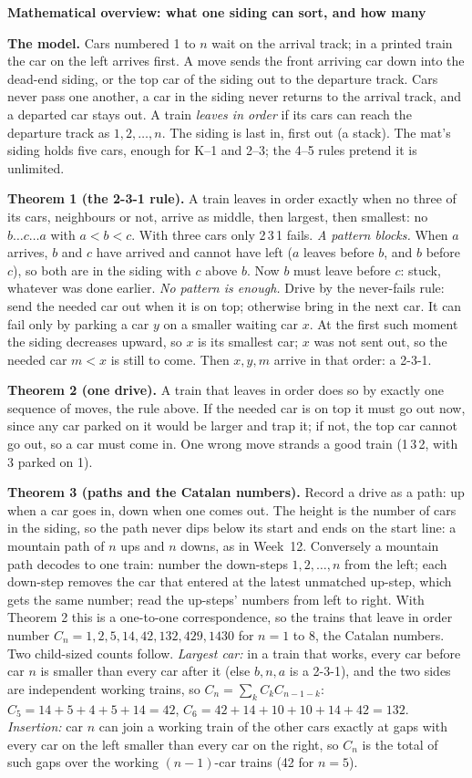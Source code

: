 \documentclass[11pt]{article}
\newcommand{\head}[1]{\par\needspace{5\baselineskip}\textbf{\large #1}\par\nopagebreak}
\newcommand{\tr}[1]{\mbox{#1}}
\begin{document}
\head{Mathematical overview: what one siding can sort, and how many}
\textbf{The model.} Cars numbered 1 to $n$ wait on the arrival track; in a printed train the car on the left arrives first. A move sends the front arriving car down into the dead-end siding, or the top car of the siding out to the departure track. Cars never pass one another, a car in the siding never returns to the arrival track, and a departed car stays out. A train \emph{leaves in order} if its cars can reach the departure track as $1,2,\dots,n$. The siding is last in, first out (a stack). The mat's siding holds five cars, enough for K--1 and 2--3; the 4--5 rules pretend it is unlimited.

\textbf{Theorem 1 (the 2-3-1 rule).} A train leaves in order exactly when no three of its cars, neighbours or not, arrive as middle, then largest, then smallest: no $b\ldots c\ldots a$ with $a<b<c$. With three cars only \tr{2\,3\,1} fails. \emph{A pattern blocks.} When $a$ arrives, $b$ and $c$ have arrived and cannot have left ($a$ leaves before $b$, and $b$ before $c$), so both are in the siding with $c$ above $b$. Now $b$ must leave before $c$: stuck, whatever was done earlier. \emph{No pattern is enough.} Drive by the never-fails rule: send the needed car out when it is on top; otherwise bring in the next car. It can fail only by parking a car $y$ on a smaller waiting car $x$. At the first such moment the siding decreases upward, so $x$ is its smallest car; $x$ was not sent out, so the needed car $m<x$ is still to come. Then $x,y,m$ arrive in that order: a 2-3-1.

\textbf{Theorem 2 (one drive).} A train that leaves in order does so by exactly one sequence of moves, the rule above. If the needed car is on top it must go out now, since any car parked on it would be larger and trap it; if not, the top car cannot go out, so a car must come in. One wrong move strands a good train (\tr{1\,3\,2}, with 3 parked on 1).

\textbf{Theorem 3 (paths and the Catalan numbers).} Record a drive as a path: up when a car goes in, down when one comes out. The height is the number of cars in the siding, so the path never dips below its start and ends on the start line: a mountain path of $n$ ups and $n$ downs, as in Week~12. Conversely a mountain path decodes to one train: number the down-steps $1,2,\dots,n$ from the left; each down-step removes the car that entered at the latest unmatched up-step, which gets the same number; read the up-steps' numbers from left to right. With Theorem 2 this is a one-to-one correspondence, so the trains that leave in order number $C_n=1,2,5,14,42,132,429,1430$ for $n=1$ to $8$, the Catalan numbers. Two child-sized counts follow. \emph{Largest car:} in a train that works, every car before car $n$ is smaller than every car after it (else $b,n,a$ is a 2-3-1), and the two sides are independent working trains, so $C_n=\sum_{k} C_kC_{n-1-k}$: $C_5=14+5+4+5+14=42$, $C_6=42+14+10+10+14+42=132$. \emph{Insertion:} car $n$ can join a working train of the other cars exactly at gaps with every car on the left smaller than every car on the right, so $C_n$ is the total of such gaps over the working $(n-1)$-car trains (42 for $n=5$).
\end{document}
